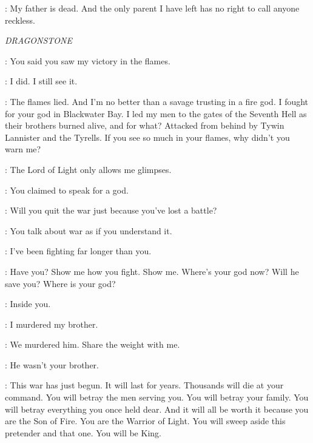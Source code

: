\ROBB: My father is dead. And the only parent I have left has no right to call anyone reckless.



\scene

\textit{DRAGONSTONE} 


\STANNIS: You said you saw my victory in the flames. 

\MELISANDRE: I did. I still see it. 

\STANNIS: The flames lied. And I'm no better than a savage trusting in a fire god.  I fought for your god in Blackwater Bay. I led my men to the gates of the Seventh Hell as their brothers burned alive, and for what? Attacked from behind by Tywin Lannister and the Tyrells. If you see so much in your flames, why didn't you warn me? 

\MELISANDRE: The Lord of Light only allows me glimpses. 

\STANNIS: You claimed to speak for a god. 

\MELISANDRE: Will you quit the war just because you've lost a battle? 

\STANNIS: You talk about war as if you understand it. 

\MELISANDRE: I've been fighting far longer than you. 

\STANNIS: Have you? Show me how you fight.  Show me. Where's your god now? Will he save you? Where is your god? 

\MELISANDRE: Inside you. 


\STANNIS: I murdered my brother. 


\MELISANDRE: We murdered him. Share the weight with me. 

\STANNIS: He wasn't your brother. 

\MELISANDRE:  This war has just begun. It will last for years. Thousands will die at your command. You will betray the men serving you. You will betray your family. You will betray everything you once held dear. And it will all be worth it because you are the Son of Fire. You are the Warrior of Light. You will sweep aside this pretender and that one. You will be King. 

